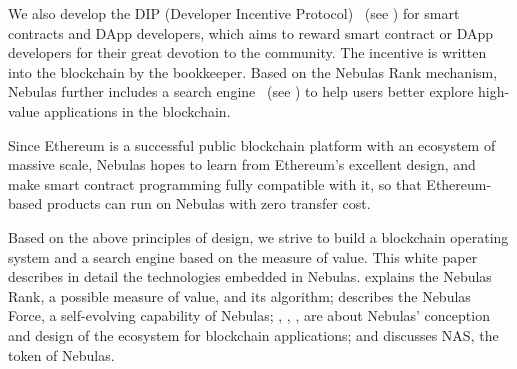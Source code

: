 \begin{itemize}
We also develop the DIP (Developer Incentive Protocol) ~(see ) for smart contracts and DApp developers, which aims to reward smart contract or DApp developers for their great devotion to the community. The incentive is written into the blockchain by the bookkeeper. Based on the Nebulas Rank mechanism, Nebulas further includes a search engine ~(see ) to help users better explore high-value applications in the blockchain.
\end{itemize}

Since Ethereum is a successful public blockchain platform with an ecosystem of massive scale, Nebulas hopes to learn from Ethereum's excellent design, and make smart contract programming fully compatible with it, so that Ethereum-based products can run on Nebulas with zero transfer cost.


Based on the above principles of design, we strive to build a blockchain operating system and a search engine based on the measure of value. This white paper describes in detail the technologies embedded in Nebulas.  explains the Nebulas Rank, a possible measure of value, and its algorithm;  describes the Nebulas Force, a self-evolving capability of Nebulas; , , ,  are about Nebulas’ conception and design of the ecosystem for blockchain applications; and  discusses NAS, the token of Nebulas.
